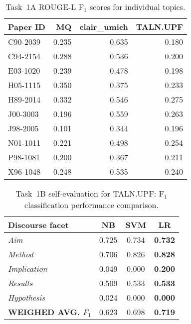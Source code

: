 \documentclass[11pt]{article}
\begin{document}
\begin{table}[t]
  \centering
  \begin{tabular}{|l|r|r|r|}
  	\hline
	Paper ID & MQ  & clair\_umich & TALN.UPF \\ 
	\hline
	C90-2039 & 0.235 & 0.635 & 0.180 \\
	C94-2154 & 0.288 & 0.536 & 0.200 \\
	E03-1020 & 0.239 & 0.478 & 0.198 \\ 
	H05-1115 & 0.350 & 0.375 & 0.233 \\
	H89-2014 & 0.332 & 0.546 & 0.275 \\
        J00-3003 & 0.196 & 0.559& 0.263\\
        J98-2005 & 0.101 & 0.344& 0.196\\
        N01-1011 & 0.221 & 0.498& 0.254\\
        P98-1081 & 0.200 & 0.367& 0.211\\
        X96-1048 & 0.248 & 0.535& 0.240\\
	\hline
  \end{tabular}
\caption{Task~1A ROUGE-L F$_1$ scores for individual topics.}
\label{tab:task1av2}
\end{table}

\begin{table}[t]\footnotesize
  \begin{center}
  \begin{tabular}{ | l | c | c | c |}
    \hline
    Discourse facet & NB & SVM & \textbf{LR} \\ \hline
    \textit{Aim} & 0.725 & 0.734 & \textbf{0.732} \\ \hline
    \textit{Method} & 0.706 & 0.826 & \textbf{0.828} \\ \hline
    \textit{Implication} & 0.049 & 0.000 & \textbf{0.200} \\ \hline
    \textit{Results} & 0.509 & 0,533 & \textbf{0.533} \\ \hline
    \textit{Hypothesis} & 0.024 & 0.000 &\textbf{ 0.000} \\ \hline
    \hline
    \textbf{WEIGHED AVG. $F_1$} & 0.623 & 0.698 & \textbf{0.719} \\ \hline
  \end{tabular}
  \caption{Task~1B self-evaluation for TALN.UPF: F$_1$ classification performance comparison.}
  \label{table:task1bAlgorithmComp}
  \end{center}
\end{table}
\end{document}
